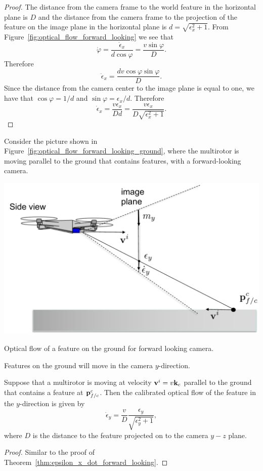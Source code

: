 \begin{proof}
  The distance from the camera frame to the world feature in the horizontal plane is $D$ and the distance from the camera frame to the projection of the feature on the image plane in the horizontal plane is $d=\sqrt{\epsilon_x^2+1}$.
	From Figure~\ref{fig:optical_flow_forward_looking} we see that
	\[
	\dot{\varphi} = \frac{\dot{\epsilon}_x}{d\cos\varphi} = \frac{v\sin\varphi}{D}.
	\]
	Therefore
	\[
	\dot{\epsilon}_x = \frac{d v \cos\varphi \sin\varphi}{D}.
	\]
	Since the distance from the camera center to the image plane is equal to one, we have that $\cos\varphi = 1/d$ and $\sin\varphi = \epsilon_x/d$.  Therefore
	\[
	\dot{\epsilon}_x = \frac{v \epsilon_x}{D d}=\frac{v \epsilon_x}{D\sqrt{\epsilon_x^2+1}}.
	\]
\end{proof}

%
Consider the picture shown in Figure~\ref{fig:optical_flow_forward_looking_ground}, where the multirotor is moving parallel to the ground that contains features, with a forward-looking camera.  
\begin{marginfigure}[-2in]
	\includegraphics[width=\linewidth]{chap7_optical_flow/figures/optical_flow_forward_looking_ground}
	\caption{Optical flow of a feature on the ground for forward looking camera.}
	\label{fig:optical_flow_forward_looking_ground}
\end{marginfigure}
Features on the ground will move in the camera $y$-direction.  
\begin{theorem} \label{thm:epsilon_y_dot_forward_looking}
	Suppose that a multirotor is moving at velocity $\mathbf{v}^i = v\mathbf{k}_c$ parallel to the ground that contains a feature at $\mathbf{p}_{f/c}^c$.  Then the calibrated optical flow of the feature in the $y$-direction is given by
	\begin{equation}\label{eq:epsilon_y_dot_forward_looking}
	\dot{\epsilon}_y = \frac{v}{D}\frac{\epsilon_y}{\sqrt{\epsilon_y^2+1}},
	\end{equation}
	where $D$ is the distance to the feature projected on to the camera $y-z$ plane.
\end{theorem}
\begin{proof}
Similar to the proof of Theorem~\ref{thm:epsilon_x_dot_forward_looking}.
\end{proof}


